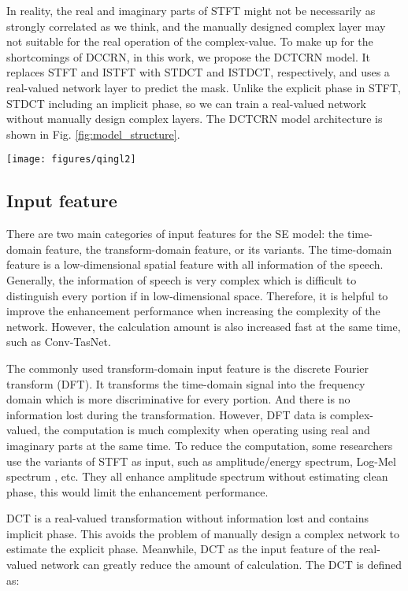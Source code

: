 \documentclass[journal,10pt]{IEEEtran}
\begin{document}
In reality, the real and imaginary parts of STFT might not be necessarily as strongly correlated as we think, and the manually designed complex layer may not suitable for the real operation of the complex-value. To make up for the shortcomings of DCCRN, in this work, we propose the DCTCRN model. It replaces STFT and ISTFT with STDCT and ISTDCT, respectively, and uses a real-valued network layer to predict the mask. Unlike the explicit phase in STFT, STDCT including an implicit phase, so we can train a real-valued network without manually design complex layers. The DCTCRN model architecture is shown in Fig. \ref{fig:model_structure}.

\begin{figure*}[t]
\centering\texttt{[image: figures/qingl2]}
\caption{Proposed model architecture}
\label{fig:model_structure}
\end{figure*}

\subsection{Input feature}

There are two main categories of input features for the SE model: the time-domain feature, the transform-domain feature, or its variants. The time-domain feature is a low-dimensional spatial feature with all information of the speech. Generally, the information of speech is very complex which is difficult to distinguish every portion if in low-dimensional space. Therefore, it is helpful to improve the enhancement performance when increasing the complexity of the network. However, the calculation amount is also increased fast at the same time, such as Conv-TasNet.

The commonly used transform-domain input feature is the discrete Fourier transform (DFT). It transforms the time-domain signal into the frequency domain which is more discriminative for every portion. And there is no information lost during the transformation. However, DFT data is complex-valued, the computation is much complexity when operating using real and imaginary parts at the same time. To reduce the computation, some researchers use the variants of STFT as input, such as amplitude/energy spectrum, Log-Mel spectrum \cite{delfarah2017features}, etc. They all enhance amplitude spectrum without estimating clean phase, this would limit the enhancement performance.

DCT is a real-valued transformation without information lost and contains implicit phase. This avoids the problem of manually design a complex network to estimate the explicit phase. Meanwhile, DCT as the input feature of the real-valued network can greatly reduce the amount of calculation. The DCT is defined as:
\end{document}

